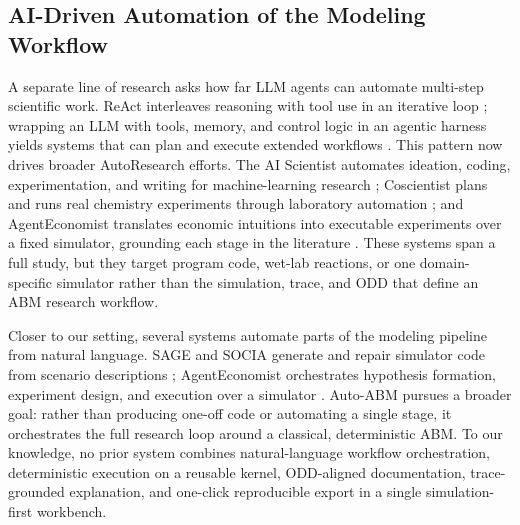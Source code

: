 \documentclass[11pt]{article}
\begin{document}
\subsection{AI-Driven Automation of the Modeling Workflow}

A separate line of research asks how far LLM agents can automate multi-step
scientific work. ReAct interleaves reasoning with tool use in an iterative loop
\citep{yao2023react}; wrapping an LLM with tools, memory, and control logic in
an agentic harness yields systems that can plan and execute extended workflows
\citep{wang2024survey}. This pattern now drives broader AutoResearch efforts.
The AI Scientist automates ideation, coding, experimentation, and writing for
machine-learning research \citep{lu2024aiscientist}; Coscientist plans and runs
real chemistry experiments through laboratory automation
\citep{boiko2023coscientist}; and AgentEconomist translates economic intuitions
into executable experiments over a fixed simulator, grounding each stage in the
literature \citep{agenteconomist2026}. These systems span a full study, but they
target program code, wet-lab reactions, or one domain-specific simulator rather
than the simulation, trace, and ODD that define an ABM research workflow.

Closer to our setting, several systems automate parts of the modeling pipeline
from natural language. SAGE and SOCIA generate and repair simulator code from
scenario descriptions \citep{niu2024sage,hua2025socia}; AgentEconomist
orchestrates hypothesis formation, experiment design, and execution over a
simulator \citep{agenteconomist2026}. Auto-ABM pursues a broader goal: rather
than producing one-off code or automating a single stage, it orchestrates the
full research loop around a classical, deterministic ABM. To our knowledge, no
prior system combines natural-language workflow orchestration, deterministic
execution on a reusable kernel, ODD-aligned documentation, trace-grounded
explanation, and one-click reproducible export in a single simulation-first
workbench.


\end{document}
